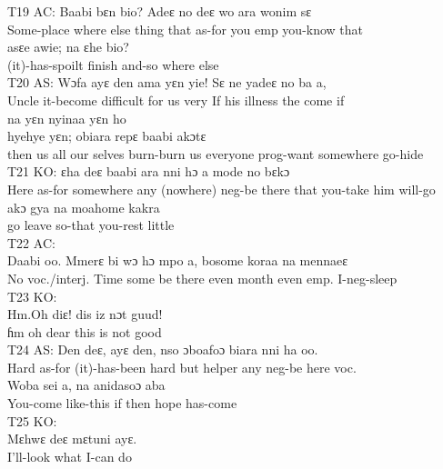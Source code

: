 \documentclass[output=paper,colorlinks,citecolor=brown]{langscibook}
\begin{document}
    \z
\ex
    T19 AC:
    \ea
    \gll    Baabi bɛn bio? Adeɛ no deɛ wo ara wonim sɛ \\
            Some-place where else thing that as-for you emp you-know that \\
    \ex
    \gll    asɛe awie; na ɛhe bio?\\
            (it)-has-spoilt finish and-so where else \\
    \z
\ex
    T20 AS:
    \ea
    \gll    Wɔfa ayɛ den ama yɛn yie! Sɛ ne yadeɛ no ba a, \\
            Uncle it-become difficult for us very If his illness the come if \\
    \ex
    \gll    na yɛn nyinaa yɛn ho \\ hyehye yɛn; obiara repɛ baabi akɔtɛ\\
            then us all our selves burn-burn us everyone prog-want somewhere go-hide\\
    \z
\ex
    T21 KO:
    \ea
    \gll    ɛha deɛ baabi ara nni hɔ a mode no bɛkɔ \\
            Here as-for somewhere any (nowhere) neg-be there that you-take him will-go \\
    \ex
    \gll    akɔ gya na moahome kakra\\
            go leave so-that you-rest little \\
    \z
\ex
    T22 AC:\\
    \gll    Daabi oo. Mmerɛ bi wɔ hɔ mpo a, bosome koraa na mennaeɛ\\
            No voc./interj. Time some be there even month even emp. I-neg-sleep \\
\ex
    T23 KO:\\
    \gll    Hm.Oh diɛ! dis iz nɔt guud!\\
            ɦm oh dear this is not good\\
\ex
    T24 AS:
    \ea
    \gll    Den deɛ, ayɛ den, nso ɔboafoɔ biara nni ha oo.\\
            Hard as-for (it)-has-been hard but helper any neg-be here voc.\\
    \ex
    \gll    Woba sei a, na anidasoɔ aba \\
            You-come like-this if then hope has-come\\
    \z
\ex
    T25 KO:\\
    \gll    Mɛhwɛ deɛ mɛtuni ayɛ.\\
 	        I’ll-look what I-can do\\
\z
\end{document}
